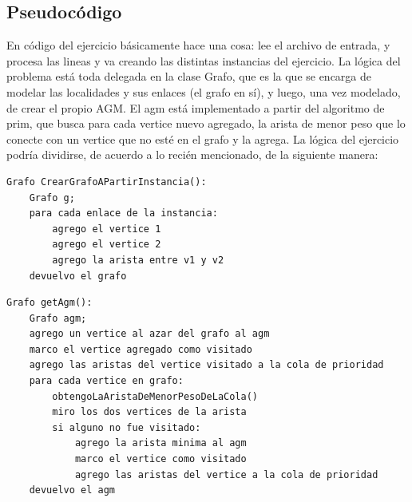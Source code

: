 \subsection{Pseudoc\'odigo}
En código del ejercicio básicamente hace una cosa: lee el archivo de entrada, y procesa las lineas y va creando las distintas instancias del ejercicio. La lógica del problema está toda delegada en la clase Grafo, que es la que se encarga de modelar las localidades y sus enlaces (el grafo en sí), y luego, una vez modelado, de crear el propio AGM. El agm está implementado a partir del algoritmo de prim, que busca para cada vertice nuevo agregado, la arista de menor peso que lo conecte con un vertice que no esté en el grafo y la agrega.
La lógica del ejercicio podría dividirse, de acuerdo a lo recién mencionado, de la siguiente manera:

\begin{verbatim}
Grafo CrearGrafoAPartirInstancia():
	Grafo g;
	para cada enlace de la instancia:
		agrego el vertice 1
		agrego el vertice 2
		agrego la arista entre v1 y v2
	devuelvo el grafo 
\end{verbatim}

\begin{verbatim}
Grafo getAgm():
	Grafo agm;
	agrego un vertice al azar del grafo al agm
	marco el vertice agregado como visitado
	agrego las aristas del vertice visitado a la cola de prioridad
	para cada vertice en grafo:
		obtengoLaAristaDeMenorPesoDeLaCola()
		miro los dos vertices de la arista
		si alguno no fue visitado:
			agrego la arista minima al agm
			marco el vertice como visitado
			agrego las aristas del vertice a la cola de prioridad
	devuelvo el agm
\end{verbatim}

